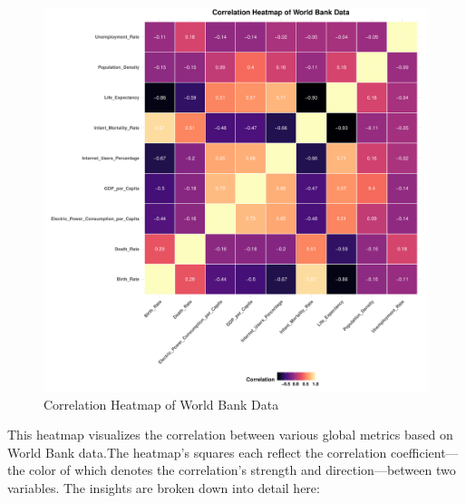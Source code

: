 \documentclass{article}\usepackage[]{graphicx}\usepackage[]{xcolor}
\makeatletter
\def\maxwidth{ %
  \ifdim\Gin@nat@width>\linewidth
    \linewidth
  \else
    \Gin@nat@width
  \fi
}
\newenvironment{knitrout}{}{} %
\makeatother
\begin{document}
\begin{figure}[h!]
\centering
\begin{knitrout}
\color{fgcolor}
\includegraphics[width=\maxwidth]{figure/unnamed-chunk-15-1} 
\end{knitrout}
\caption{Correlation Heatmap of World Bank Data}
\label{fig}
\end{figure}
This heatmap visualizes the correlation between various global metrics based on World Bank data.The heatmap's squares each reflect the correlation coefficient—the color of which denotes the correlation's strength and direction—between two variables. The insights are broken down into detail here:
\end{document}
